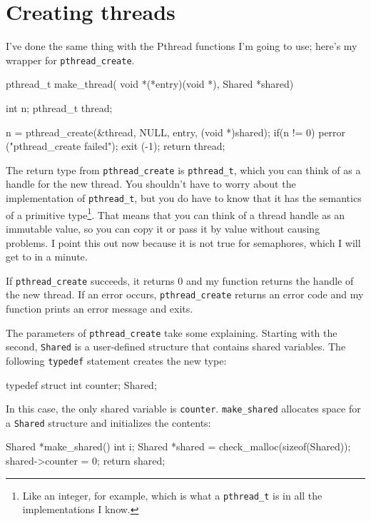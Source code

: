 \documentclass{book}
\begin{document}
\section{Creating threads}

I've done the same thing with the Pthread functions I'm going to use;
here's my wrapper for {\tt pthread\_create}.

\begin{unbreakable}[title={}]{}
pthread_t make_thread(
    void *(*entry)(void *), 
    Shared *shared) 
{
  int n;
  pthread_t thread;

  n = pthread_create(&thread, NULL, entry, 
    (void *)shared);
  if(n != 0) {
    perror ("pthread_create failed");
    exit (-1);
  }
  return thread;
}
\end{unbreakable}

The return type from {\tt pthread\_create} is {\tt pthread\_t},
which you can think of as a handle for the new thread.  You
shouldn't have to worry about the implementation of {\tt pthread\_t},
but you do have to know that it has the semantics of a primitive
type\footnote{Like an integer, for example, which is what a
        {\tt pthread\_t} is in all the implementations I know.}.  That
means that you can think of a thread handle as an immutable
value, so you can copy it or pass it by value without causing
problems.  I point this out now because it is not true for
semaphores, which I will get to in a minute.

If {\tt pthread\_create} succeeds, it returns 0 and my function
returns the handle of the new thread.
If an error occurs, {\tt pthread\_create}
returns an error code and my function prints an error message
and exits.

The parameters of {\tt pthread\_create} take some
explaining.  Starting with the second,
{\tt Shared}
is a user-defined structure that contains shared variables.
The following {\tt typedef} statement creates the new type:

\begin{unbreakable}[title={}]{}
typedef struct {
  int counter;
} Shared;
\end{unbreakable}

In this case, the only shared variable is {\tt counter}.
{\tt make\_shared} allocates
space for a {\tt Shared} structure and initializes the contents:

\begin{unbreakable}[title={}]{}
Shared *make_shared() {
  int i;
  Shared *shared = 
    check_malloc(sizeof(Shared));
  shared->counter = 0;
  return shared;
}
\end{unbreakable}
\end{document}
